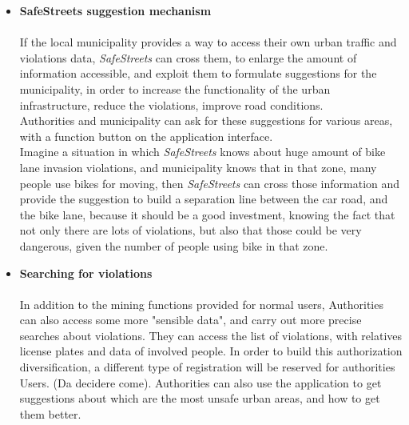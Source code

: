    \begin{itemize}
   
    
    \item\textbf{SafeStreets suggestion mechanism}\\\\
    If the local municipality provides a way to access their own urban traffic and violations data, \textit{SafeStreets} can cross them, to enlarge the amount of information accessible, and exploit them to formulate suggestions for the municipality, in order to increase the functionality of the urban infrastructure, reduce the violations, improve road conditions.\\ Authorities and municipality can ask for these suggestions for various areas, with a function button on the application interface.\\
    Imagine a situation in which \textit{SafeStreets} knows about huge amount of bike lane invasion violations, and municipality knows that in that zone, many people use bikes for moving, then \textit{SafeStreets} can cross those information and provide the suggestion to build a separation line between the car road, and the bike lane, because it should be a good investment, knowing the fact that not only there are lots of violations, but also that those could be very dangerous, given the number of people using bike in that zone. 
    
    
     
    \item\textbf{Searching for violations}\\\\
    In addition to the mining functions provided for normal users, Authorities can also access some more "sensible data", and carry out more precise searches about violations. They can access the list of violations, with relatives license plates and data of involved people. In order to build this authorization diversification, a different type of registration will be reserved for authorities Users. (Da decidere come).
    Authorities can also use the application to get suggestions about which are the most unsafe urban areas, and how to get them better.
    

\end{itemize}
